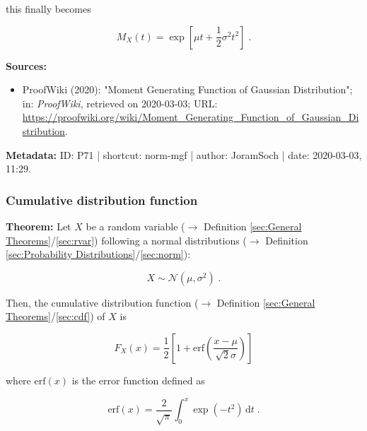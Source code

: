 \documentclass[a4paper,12pt,twoside]{book}
\begin{document}
this finally becomes

\begin{equation} \label{eq:norm-mgf-norm-mgf-qed}
M_X(t) = \exp\left[ \mu t + \frac{1}{2} \sigma^2 t^2 \right] \; .
\end{equation}


\vspace{1em}
\textbf{Sources:}
\begin{itemize}
\item ProofWiki (2020): "Moment Generating Function of Gaussian Distribution"; in: \textit{ProofWiki}, retrieved on 2020-03-03; URL: \url{https://proofwiki.org/wiki/Moment_Generating_Function_of_Gaussian_Distribution}.
\end{itemize}


\vspace{1em}
\textbf{Metadata:} ID: P71 | shortcut: norm-mgf | author: JoramSoch | date: 2020-03-03, 11:29.
\vspace{1em}



\subsubsection[\textbf{Cumulative distribution function}]{Cumulative distribution function} \label{sec:norm-cdf}
\setcounter{equation}{0}

\textbf{Theorem:} Let $X$ be a random variable ($\rightarrow$ Definition \ref{sec:General Theorems}/\ref{sec:rvar}) following a normal distributions ($\rightarrow$ Definition \ref{sec:Probability Distributions}/\ref{sec:norm}):

\begin{equation} \label{eq:norm-cdf-norm}
X \sim \mathcal{N}(\mu, \sigma^2) \; .
\end{equation}

Then, the cumulative distribution function ($\rightarrow$ Definition \ref{sec:General Theorems}/\ref{sec:cdf}) of $X$ is

\begin{equation} \label{eq:norm-cdf-norm-cdf}
F_X(x) = \frac{1}{2} \left[ 1 + \mathrm{erf}\left( \frac{x-\mu}{\sqrt{2} \sigma} \right) \right]
\end{equation}

where $\mathrm{erf}(x)$ is the error function defined as

\begin{equation} \label{eq:norm-cdf-erf}
\mathrm{erf}(x) = \frac{2}{\sqrt{\pi}} \int_{0}^{x} \exp(-t^2) \, \mathrm{d}t \; .
\end{equation}
\end{document}
